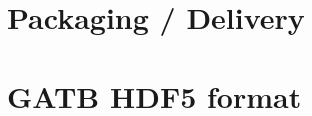 \documentclass{book}
\begin{document}
\chapter{Packaging / Delivery}

\chapter{GATB HDF5 format}
\end{document}
